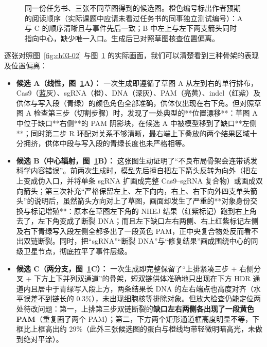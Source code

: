 \begin{figure}[htbp]
\begin{minipage}[t]{0.32\linewidth}
\end{minipage}
\caption{同一份任务书、三张不同草图得到的候选图。橙色编号标出作者预期的阅读顺序（实际课题中应请未看过任务书的同事独立测试编号）：A 与 C 的顺序清晰且与事件先后一致；B 中左上与左下两支箭头同时指向中心，缺少唯一入口。生成后已对照草图核查位置偏离。}\label{fig:ch03-03}
\end{figure}

逐张对照图~\ref{fig:ch03-02} 与图~\ref{fig:ch03-03} 的实际画面，我们可以清楚看到三种骨架的表现及位置偏离：

\begin{itemize}
\item \textbf{候选 A（线性，图~\ref{fig:ch03-03}A）：} 一次生成即遵循了草图 A 从左到右的单行排布，Cas9（蓝灰）、sgRNA（橙）、DNA（深灰）、PAM（亮黄）、indel（红紫）及供体与写入段（青绿）的颜色角色全部准确，供体仅出现在右下角。但对照草图 A 检查第三步（切割步骤）时，发现了一处典型的**位置漂移**：草图 A 中位于缺口**右侧**的 PAM 阴影块，在候选 A 中被模型移到了缺口**左侧**；同时第二步 R 环配对关系不够清晰，最右端上下叠放的两个结果区域十分拥挤，供体中段与写入段的青绿长度也未严格相等。
\item \textbf{候选 B（中心辐射，图~\ref{fig:ch03-03}B）：} 这张图生动证明了“不良布局骨架会连带诱发科学内容错误”。前两次生成时，模型先后擅自把左下箭头反转为向外（把左上变成伪入口，并将单条 sgRNA 扩画成完整 Cas9–sgRNA 复合物）或画成双向箭头；第三次补充“严格保留左上、左下向内，右上、右下向外四支单头箭头”的说明后，虽然箭头方向对上了草图，画面却发生了严重的**对象身份交换与标记增殖**：原本在草图左下角的 NHEJ 结果（红紫标记）跑到右上角去了，左下角变成了断裂 DNA；而且左下缺口左右两侧、右上红紫标记左侧及右下青绿写入段左侧全都多出了一段黄色 PAM，正中央复合物处反而看不出双链断裂。同时，把“sgRNA”“断裂 DNA”与“修复结果”画成围绕中心的同级卫星节点，彻底拉平了事件层级。
\item \textbf{候选 C（两分支，图~\ref{fig:ch03-03}C）：} 一次生成即完整保留了“上排紧凑三步 + 右侧分叉 + 下方上下并列双通道”的骨架，短双链供体准确地只出现在下方 HDR 通道内且居中于青绿写入段上方，两条结果长 DNA 的左右端点也高度对齐（水平误差不到链长的 0.3\%），未出现细胞核等排除对象。但放大检查仍能定位两处待改问题：第一，上排第三步双链断裂的\textbf{缺口左右两侧各出现了一段黄色 PAM}（重复画了两个 PAM）；第二，下方两个矩形通道框高度明显不等，下框比上框高出约 29\%（此外三张候选图的蛋白与橙线均带轻微明暗高光，未做到绝对平涂）。
\end{itemize}

